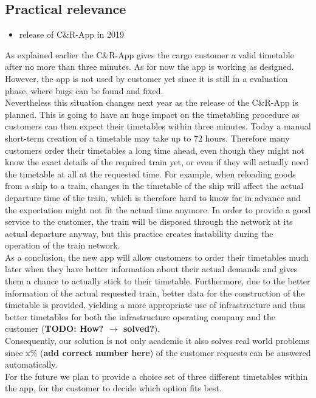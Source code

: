 \subsection{Practical relevance}
\begin{itemize}
  \item release of C\&R-App in 2019 \\
\end{itemize}
As explained earlier the C\&R-App gives the cargo customer a valid timetable after no more than three minutes. As for now the app is working as designed. However, the app is not used by customer yet since it is still in a evaluation phase, where bugs can be found and fixed. \\
Nevertheless this situation changes next year as the release of the C\&R-App is planned. This is going to have an huge impact on the timetabling procedure as customers can then expect their timetables within three minutes. Today a manual short-term creation of a timetable may take up to 72 hours. Therefore many customers order their timetables a long time ahead, even though they might not know the exact details of the required train yet, or even if they will actually need the timetable at all at the requested time.
For example, when reloading goods from a ship to a train, changes in the timetable of the ship will affect the actual departure time of the train, which is therefore hard to know far in advance and the expectation might not fit the actual time anymore. In order to provide a good service to the customer, the train will be disposed through the network at its actual departure anyway, but this practice creates instability during the operation of the train network.\\
As a conclusion, the new app will allow customers to order their timetables much later when they have better information about their actual demands and gives them a chance to actually stick to their timetable. Furthermore, due to the better information of the actual requested train, better data for the construction of the timetable is provided, yielding a more appropriate use of infrastructure and thus better timetables for both the infrastructure operating company and the customer (\textbf{TODO: How? $\rightarrow$ solved?}). \\
Consequently, our solution is not only academic it also solves real world problems since x\% (\textbf{add correct number here}) of the customer requests can be answered automatically. \\
For the future we plan to provide a choice set of three different timetables within the app, for the customer to decide which option fits best. \\
